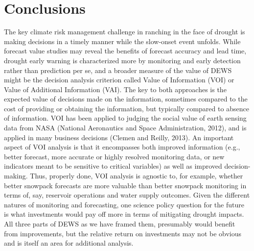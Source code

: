 \documentclass[11pt]{article}
\begin{document}
\section{Conclusions}
The key climate risk management challenge in ranching in the face of drought is making decisions in a timely manner while the slow-onset event unfolds. While forecast value studies may reveal the benefits of forecast accuracy and lead time, drought early warning is characterized more by monitoring and early detection rather than prediction per se, and a broader measure of the value of DEWS might be the decision analysis criterion called Value of Information (VOI) or Value of Additional Information (VAI). The key to both approaches is the expected value of decisions made on the information, sometimes compared to the cost of providing or obtaining the information, but typically compared to absence of information. VOI has been applied to judging the social value of earth sensing data from NASA (National Aeronautics and Space Administration, 2012), and is applied in many business decisions (Clemen and Reilly, 2013). An important aspect of VOI analysis is that it encompasses both improved information (e.g., better forecast, more accurate or highly resolved monitoring data, or new indicators meant to be sensitive to critical variables) as well as improved decision-making. Thus, properly done, VOI analysis is agnostic to, for example, whether better snowpack forecasts are more valuable than better snowpack monitoring in terms of, say, reservoir operations and water supply outcomes. 
Given the different natures of monitoring and forecasting, one science policy question for the future is what investments would pay off more in terms of mitigating drought impacts. All three parts of DEWS as we have framed them, presumably would benefit from improvements, but the relative return on investments may not be obvious and is itself an area for additional analysis. 


\newpage


\end{document}
